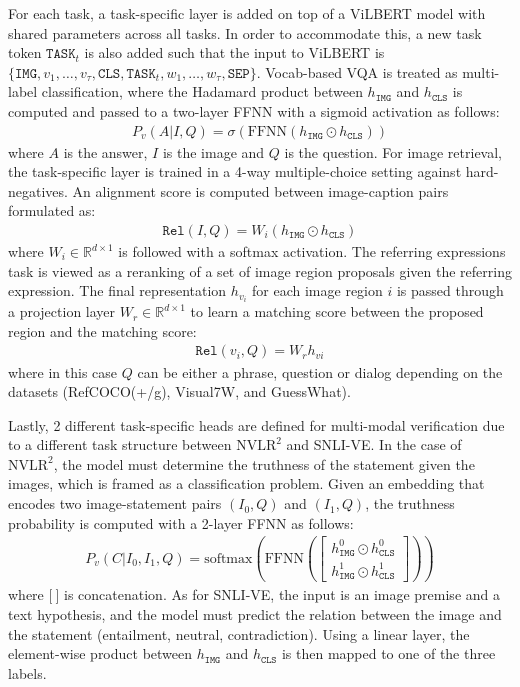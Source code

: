 \documentclass{article}
\begin{document}
For each task, a task-specific layer is added on top of a ViLBERT model with shared parameters across all tasks. In order to accommodate this, a new task token $\mathtt{TASK}_{t}$ is also added such that the input to ViLBERT is $\{\mathtt{IMG}, v_{1}, \dots, v_{\tau}, \mathtt{CLS}, \mathtt{TASK}_{t}, w_{1}, \dots, w_{\tau}, \mathtt{SEP}\}$. Vocab-based VQA is treated as multi-label classification, where the Hadamard product between $h_{\mathtt{IMG}}$ and $h_{\mathtt{CLS}}$ is computed and passed to a two-layer FFNN with a sigmoid activation as follows:
\begin{align}
    P_{v}(A|I, Q) = \sigma(\text{FFNN}(h_{\mathtt{IMG}} \odot h_{\mathtt{CLS}}))
\end{align}
where $A$ is the answer, $I$ is the image and $Q$ is the question. For image retrieval, the task-specific layer is trained in a 4-way multiple-choice setting against hard-negatives. An alignment score is computed between image-caption pairs formulated as:
\begin{align}
    \mathtt{Rel}(I,Q) = W_{i}(h_{\mathtt{IMG}} \odot h_{\mathtt{CLS}})
\end{align}
where $W_{i} \in \mathbb{R}^{d \times 1}$ is followed with a softmax activation. The referring expressions task is viewed as a reranking of a set of image region proposals given the referring expression. The final representation $h_{v_{i}}$ for each image region $i$ is passed through a projection layer $W_{r} \in \mathbb{R}^{d \times 1}$ to learn a matching score between the proposed region and the matching score: 
\begin{align}
    \mathtt{Rel}(v_{i}, Q) = W_{r}h_{vi}
\end{align}
where in this case $Q$ can be either a phrase, question or dialog depending on the datasets (RefCOCO(+/g), Visual7W, and GuessWhat). 

Lastly, 2 different task-specific heads are defined for multi-modal verification due to a different task structure between $\text{NVLR}^2$ and SNLI-VE. In the case of $\text{NVLR}^{2}$, the model must determine the truthness of the statement given the images, which is framed as a classification problem. Given an embedding that encodes two image-statement pairs $(I_{0}, Q)$ and $(I_{1}, Q)$, the truthness probability is computed with a 2-layer FFNN as follows:
\begin{align}
    P_{v}(C|I_{0}, I_{1}, Q) = \text{softmax}\left(\text{FFNN}\left(\begin{bmatrix} 
    h_{\mathtt{IMG}}^{0} \odot h_{\mathtt{CLS}}^{0} \\
    h_{\mathtt{IMG}}^{1} \odot h_{\mathtt{CLS}}^{1}
    \end{bmatrix}\right)\right)
\end{align}
where $\mathbb{[}\: \mathbb{]}$ is concatenation. As for SNLI-VE, the input is an image premise and a text hypothesis, and the model must predict the relation between the image and the statement (entailment, neutral, contradiction). Using a linear layer, the element-wise product between $h_{\mathtt{IMG}}$ and $h_{\mathtt{CLS}}$ is then mapped to one of the three labels.
\end{document}
